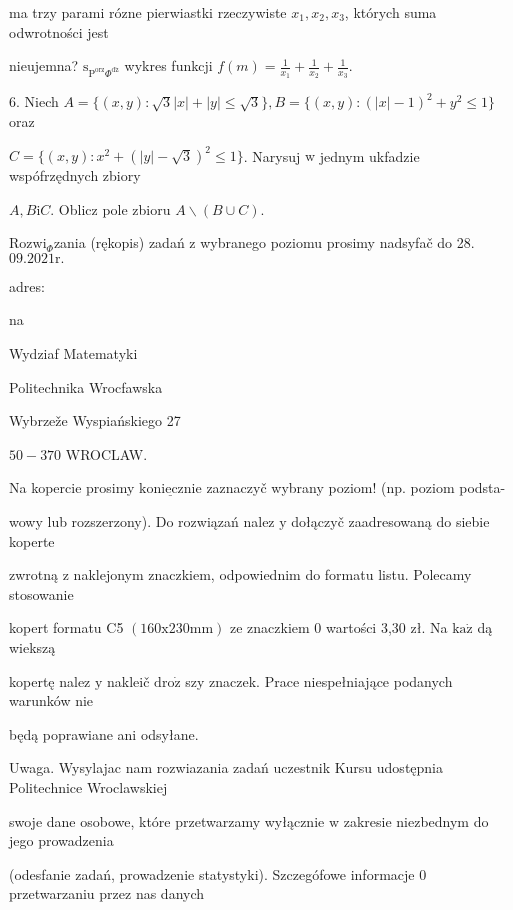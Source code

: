 \documentclass[a4paper,12pt]{article}
\begin{document}
ma trzy parami rózne pierwiastki rzeczywiste $x_{1}, x_{2}, x_{3}$, których suma odwrotności jest

nieujemna? $\mathrm{s}_{\mathrm{P}^{\mathrm{o}\mathrm{r}\mathrm{z}}\Phi^{\mathrm{d}\acute{\mathrm{z}}}}$ wykres funkcji $f(m)=\displaystyle \frac{1}{x_{1}}+\frac{1}{x_{2}}+\frac{1}{x_{3}}.$

6. Niech $A = \{(x,y):\sqrt{3}|x|+|y|\leq\sqrt{3}\}, B = \{(x,y):(|x|-1)^{2}+y^{2}\leq 1\}$ oraz

$C=\{(x,y):x^{2}+(|y|-\sqrt{3})^{2}\leq 1\}$. Narysuj $\mathrm{w}$ jednym ukfadzie wspófrzędnych zbiory

$A, B\mathrm{i}C$. Oblicz pole zbioru $A\backslash (B\cup C).$

$\mathrm{R}\mathrm{o}\mathrm{z}\mathrm{w}\mathrm{i}_{\Phi}$zania (rękopis) zadań $\mathrm{z}$ wybranego poziomu prosimy nadsyfač do 28.$09.2021\mathrm{r}.$

adres:

na

Wydziaf Matematyki

Politechnika Wrocfawska

Wybrzeže Wyspiańskiego 27

$50-370$ WROCLAW.

Na kopercie prosimy $\underline{\mathrm{k}\mathrm{o}\mathrm{n}\mathrm{i}\mathrm{e}\mathrm{c}\mathrm{z}\mathrm{n}\mathrm{i}\mathrm{e}}$ zaznaczyč wybrany poziom! (np. poziom podsta-

wowy lub rozszerzony). Do rozwiązań nalez $\mathrm{y}$ dołączyč zaadresowaną do siebie koperte

zwrotną $\mathrm{z}$ naklejonym znaczkiem, odpowiednim do formatu listu. Polecamy stosowanie

kopert formatu C5 $(160\mathrm{x}230\mathrm{m}\mathrm{m})$ ze znaczkiem $0$ wartości 3,30 zł. Na $\mathrm{k}\mathrm{a}\dot{\mathrm{z}}$ dą wiekszą

kopertę nalez $\mathrm{y}$ nakleič $\mathrm{d}\mathrm{r}\mathrm{o}\dot{\mathrm{z}}$ szy znaczek. Prace niespełniające podanych warunków nie

będą poprawiane ani odsyłane.

Uwaga. Wysylajac nam rozwiazania zadań uczestnik Kursu udostępnia Politechnice Wroclawskiej

swoje dane osobowe, które przetwarzamy wyłącznie $\mathrm{w}$ zakresie niezbednym do jego prowadzenia

(odesfanie zadań, prowadzenie statystyki). Szczegófowe informacje $0$ przetwarzaniu przez nas danych
\end{document}
